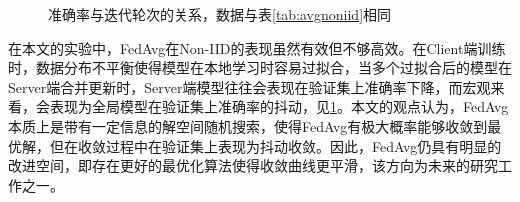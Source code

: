 \documentclass[zihao = -4,cn]{oucart}
\begin{document}
\begin{figure} 
	
	\centering 
	\caption{\label{fig:curve}准确率与迭代轮次的关系，数据与表\ref{tab:avgnoniid}相同} 
\end{figure}


在本文的实验中，FedAvg在Non-IID的表现虽然有效但不够高效。在Client端训练时，数据分布不平衡使得模型在本地学习时容易过拟合，当多个过拟合后的模型在Server端合并更新时，Server端模型往往会表现在验证集上准确率下降，而宏观来看，会表现为全局模型在验证集上准确率的抖动，见\ref{fig:curve}。本文的观点认为，FedAvg本质上是带有一定信息的解空间随机搜索，使得FedAvg有极大概率能够收敛到最优解，但在收敛过程中在验证集上表现为抖动收敛。因此，FedAvg仍具有明显的改进空间，即存在更好的最优化算法使得收敛曲线更平滑，该方向为未来的研究工作之一。\par
\end{document}
